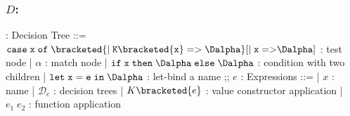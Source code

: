 \documentclass[]{article}
\DeclareMathOperator{\dom}{dom}
\begin{document}
\bigskip 

\subsubsection{$D$:}

\begin{center}
    \begin{bnf}
        \Dalpha : \textsf{Decision Tree} ::= 
        $\tt{case} \; x \; \tt{of} \; 
        \bracketed{\vert \; K\bracketed{x} \; \tt{=>} \; \Dalpha}
        [\vert \; x \; \tt{=>} \Dalpha]$ : test node 
        | $\alpha$ : match node 
        | $\tt{if} \; x \; \tt{then} \; \Dalpha \; \tt{else} \; \Dalpha$ : condition with two children 
        | $\tt{let} \; x \; \tt{=} \; e \; \tt{in} \; \Dalpha$ : let-bind a name
        ;;
        $e$ : \textsf{Expressions} ::=
        | $x$ : name
        | $\mathcal{D}_{e}$ : decision trees 
        | $K \bracketed{e}$ : value constructor application 
        | $e_1 \; e_2$ : function application 
    \end{bnf}
\end{center}

        




\end{document}
